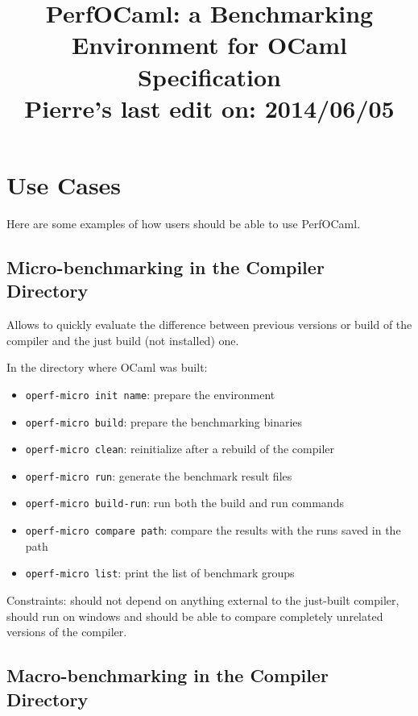 \documentclass[11pt,a4paper]{article}
\begin{document}
\title{PerfOCaml: a Benchmarking Environment for OCaml\\Specification\\Pierre's last edit on: 2014/06/05}

\maketitle
\tableofcontents
\section{Use Cases}

Here are some examples of how users should be able to use PerfOCaml.

\subsection{Micro-benchmarking in the Compiler Directory}

Allows to quickly evaluate the difference between previous versions or
build of the compiler and the just build (not installed) one.

In the directory where OCaml was built:
\begin{itemize}
\item {\tt operf-micro init name}: prepare the environment
\item {\tt operf-micro build}: prepare the benchmarking binaries
\item {\tt operf-micro clean}: reinitialize after a rebuild of the compiler
\item {\tt operf-micro run}: generate the benchmark result files
\item {\tt operf-micro build-run}: run both the build and run commands
\item {\tt operf-micro compare path}: compare the results with the runs saved in the path
\item {\tt operf-micro list}: print the list of benchmark groups
\end{itemize}

Constraints: should not depend on anything external to the just-built
compiler, should run on windows and should be able to compare
completely unrelated versions of the compiler.

\subsection{Macro-benchmarking in the Compiler Directory}
\end{document}
